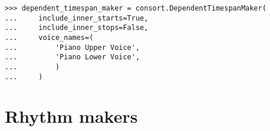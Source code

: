 \begin{comment}
<abjad>
timespan_maker = consort.TaleaTimespanMaker(
    initial_silence_talea=rhythmmakertools.Talea(
        counts=(0, 4),
        denominator=16,
        )
    )
</abjad>

\begin{singlespacing}
\vspace{-0.5\baselineskip}
\begin{lstlisting}
>>> timespan_maker = consort.TaleaTimespanMaker(
...     initial_silence_talea=rhythmmakertools.Talea(
...         counts=(0, 4),
...         denominator=16,
...         )
...     )
\end{lstlisting}
\end{singlespacing}

- taleas: playing, silence and initial silence

- groupings

- synchronization

- repeat and reflect

\subsection{DependentTimespanMaker}

\begin{comment}
<abjad>
dependent_timespan_maker = consort.DependentTimespanMaker(
    include_inner_starts=True,
    include_inner_stops=False,
    voice_names=(
        'Piano Upper Voice',
        'Piano Lower Voice',
        )
    )
</abjad>
\end{comment}

\begin{singlespacing}
\vspace{-0.5\baselineskip}
\begin{lstlisting}
>>> dependent_timespan_maker = consort.DependentTimespanMaker(
...     include_inner_starts=True,
...     include_inner_stops=False,
...     voice_names=(
...         'Piano Upper Voice',
...         'Piano Lower Voice',
...         )
...     )
\end{lstlisting}
\end{singlespacing}

\section{Rhythm makers}

